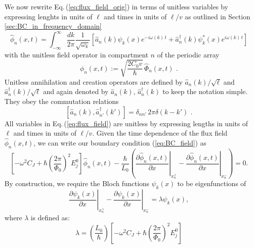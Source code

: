 %
We now rewrite Eq.\,(\ref{eq:flux_field_orig}) in terms of unitless variables 
by expressing lenghts in units of $\ell$ and times in units of $\ell/v$
as outlined in Section \ref{sec:BC_in_frequency_domain}  
%
\begin{equation} \label{eq:flux_field}
    \hat{\phi}_n(x,t) = 
    \int_{-\infty}^{\infty}\frac{dk}{2 \pi} \frac{1}{\sqrt{\omega_k}}
    \left[ \hat{a}_n(k) \psi_k(x)e^{-i \omega(k) \, t} + 
    \hat{a}_n^{\dagger}(k) \psi_k^*(x) e^{i \omega(k) \, t} \right]
\end{equation}
%
with the unitless field operator in compartment $n$ of the periodic array
%
\begin{equation} \label{eq:ufo}
\hat{\phi}_n(x,t) := \sqrt{\frac{2 C_0 v}{\hbar}} \, \hat{\Phi}_n(x,t) \, \, .
\end{equation}
%
Unitless annihilation and creation operators are defined by $\hat{a}_n(k)/\sqrt{\ell}$ 
and ${\hat a}_{n}^\dagger(k) / \sqrt{\ell}$ and again denoted by
$\hat{a}_n(k)$, ${\hat a}_{n}^\dagger(k)$ to keep the notation simple. 
They obey the commutation relations 
%
\begin{equation} \label{eq:cra}
    \left[ \hat{a}_n(k),{\hat a}_{n'}^\dagger(k') \right] = \delta_{nn'} \, 2 \pi \delta(k - k') \, \, .
\end{equation}
%
All variables in Eq.\,(\ref{eq:flux_field}) are unitless by expressing lengths in units of $\ell$
and times in units of $\ell/v$.
%
\color{black}
%
%
Given the time dependence of the flux field $\hat{\phi}_n(x,t)$, we can write our boundary condition (\ref{eq:BC_field}) as
%
\begin{equation}
\left[-\omega^2 C_{J}+\hbar\left(\frac{2 \pi}{\Phi_{0}}\right)^{2} E_{j}^0\right]\hat{\phi}_n(x,t) -\frac{\hbar}{L_{0}}\left(\left.\frac{\partial \hat{\phi}_n(x,t)}{\partial x}\right|_{x_n^{+}}-\left.\frac{\partial \hat{\phi}_n(x,t)}{\partial x}\right|_{x_n^{-}}\right)=0.
\end{equation}
%
By construction, we require the Bloch functions $\psi_k(x)$ to be eigenfunctions of
%
\begin{equation}\label{eq:bloch_eigenvalproblem}
\left.\frac{\partial\psi_{k}(x)}{\partial x}\right|_{x_n^{+}}-\left.\frac{\partial\psi_{k}(x)}{\partial x}\right|_{x_n^{-}}=\lambda \psi_k(x),
\end{equation}
%
where $\lambda$ is defined as:
%
\begin{equation}
\lambda = \left(\frac{L_0}{\hbar}\right)  
\left[-\omega^2 C_{J}+\hbar\left(\frac{2 \pi}{\Phi_{0}}\right)^{2} E_{j}^0\right]
\end{equation}
